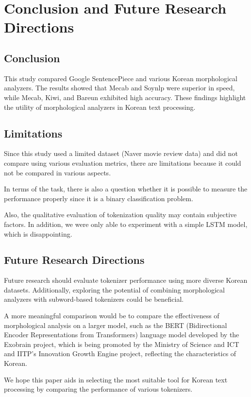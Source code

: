\documentclass{article}
\begin{document}
\section{Conclusion and Future Research Directions}

\subsection{Conclusion}

This study compared Google SentencePiece and various Korean morphological analyzers. The results showed that Mecab and Soynlp were superior in speed, while Mecab, Kiwi, and Bareun exhibited high accuracy. These findings highlight the utility of morphological analyzers in Korean text processing.

\subsection{Limitations}
Since this study used a limited dataset (Naver movie review data) and did not compare using various evaluation metrics, there are limitations because it could not be compared in various aspects.

In terms of the task, there is also a question whether it is possible to measure the performance properly since it is a binary classification problem.

Also, the qualitative evaluation of tokenization quality may contain subjective factors. In addition, we were only able to experiment with a simple LSTM model, which is disappointing.

\subsection{Future Research Directions}

Future research should evaluate tokenizer performance using more diverse Korean datasets. Additionally, exploring the potential of combining morphological analyzers with subword-based tokenizers could be beneficial.

A more meaningful comparison would be to compare the effectiveness of morphological analysis on a larger model, such as the BERT (Bidirectional Encoder Representations from Transformers) language model developed by the Exobrain project, which is being promoted by the Ministry of Science and ICT and IITP's Innovation Growth Engine project, reflecting the characteristics of Korean.

We hope this paper aids in selecting the most suitable tool for Korean text processing by comparing the performance of various tokenizers.
\end{document}
